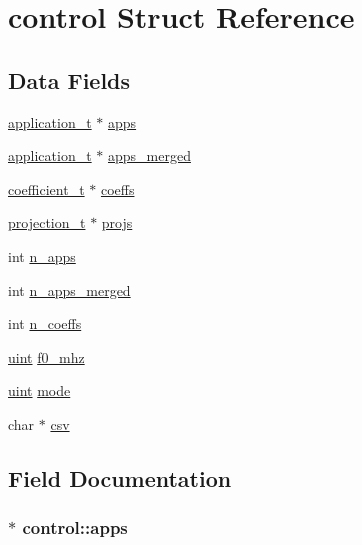 \hypertarget{structcontrol}{}\section{control Struct Reference}
\label{structcontrol}
\subsection*{Data Fields}
\begin{DoxyCompactItemize}
\item 
\hyperlink{application_8h_af0a524c43fc5f548021099181df194bf}{application\+\_\+t} $\ast$ \hyperlink{structcontrol_a94e8577f94e22cd211cd5456486e5acf}{apps}
\item 
\hyperlink{application_8h_af0a524c43fc5f548021099181df194bf}{application\+\_\+t} $\ast$ \hyperlink{structcontrol_ae522f2f8c84a5ae42afa56a256047304}{apps\+\_\+merged}
\item 
\hyperlink{coefficient_8h_a7f58a37ee368b55a21d66b1b4e76e779}{coefficient\+\_\+t} $\ast$ \hyperlink{structcontrol_a824711ff421f53cfa70d16121b61887d}{coeffs}
\item 
\hyperlink{projection_8h_a50fc11780fbb9af29b37d325d803a2da}{projection\+\_\+t} $\ast$ \hyperlink{structcontrol_ab8a72c0f5de8d4f3dfe74f75c59116e1}{projs}
\item 
int \hyperlink{structcontrol_a1f6a496b5c9139cefb6160126a35d441}{n\+\_\+apps}
\item 
int \hyperlink{structcontrol_abbe1758b776d494be512904ee15314ad}{n\+\_\+apps\+\_\+merged}
\item 
int \hyperlink{structcontrol_ab6adbaa20aa1a77de8bbfa162e591710}{n\+\_\+coeffs}
\item 
\hyperlink{generic_8h_a91ad9478d81a7aaf2593e8d9c3d06a14}{uint} \hyperlink{structcontrol_a68c1711de0d975a8463c36213150f172}{f0\+\_\+mhz}
\item 
\hyperlink{generic_8h_a91ad9478d81a7aaf2593e8d9c3d06a14}{uint} \hyperlink{structcontrol_abac58f8c6d52b42d6e2b133f078950db}{mode}
\item 
char $\ast$ \hyperlink{structcontrol_a21fdf3e624ee92abe1108476164c3378}{csv}
\end{DoxyCompactItemize}


\subsection{Field Documentation}
\subsubsection[{\texorpdfstring{apps}{apps}}]{$\ast$ control\+::apps}\hypertarget{structcontrol_a94e8577f94e22cd211cd5456486e5acf}{}\label{structcontrol_a94e8577f94e22cd211cd5456486e5acf}
